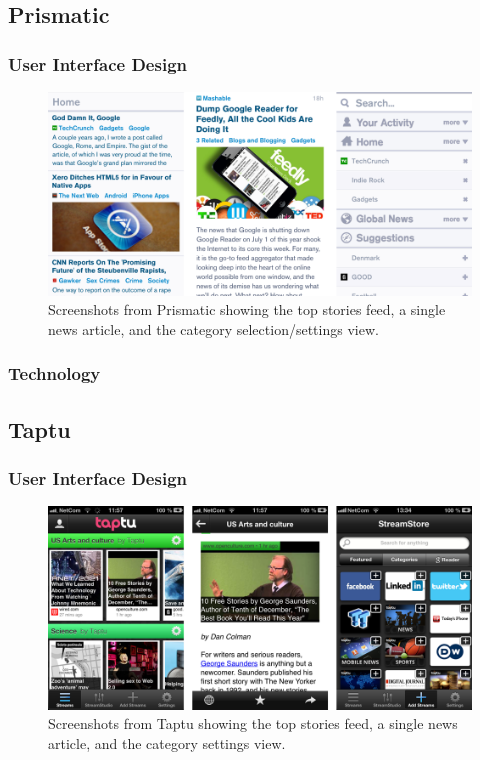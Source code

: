 \subsection{Prismatic}

\subsubsection{User Interface Design}

\begin{figure}[!htbp]
\centering
\includegraphics[width=130mm]{GFX/screenshots/prismatic.png}
\caption{Screenshots from Prismatic showing the top stories feed, a single news article, and the category selection/settings view.}
\label{screenshots_prismatic}
\end{figure}

\subsubsection{Technology}


\subsection{Taptu}

\subsubsection{User Interface Design}

\begin{figure}[!htbp]
\centering
\includegraphics[width=130mm]{GFX/screenshots/taptu.png}
\caption{Screenshots from Taptu showing the top stories feed, a single news article, and the category settings view.}
\label{screenshots_taptu}
\end{figure}

